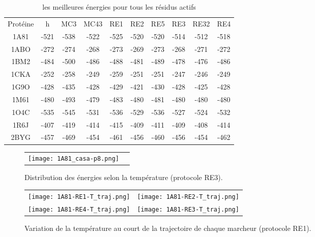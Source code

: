     \begin{table}[h]
      \centering

      \begin{tabular}{cccccccccc}

        \toprule
        Protéine & h & MC3 & MC43 & RE1 & RE2 & RE5 & RE3 & RE32 & RE4 \\
        \cmidrule{1-10}
        1A81 & -521 & -538 & -522 & -525 & -520 & -520 & -514 & -512 & -518 \\
        1ABO & -272 & -274 & -268 & -273 & -269 & -273 & -268 & -271 & -272 \\
        1BM2 & -484 & -500 & -486 & -488 & -481 & -489 & -478 & -476 & -486 \\
        1CKA & -252 & -258 & -249 & -259 & -251 & -251 & -247 & -246 & -249 \\
        1G9O & -428 & -435 & -428 & -429 & -421 & -430 & -428 & -425 & -428 \\
        1M61 & -480 & -493 & -479 & -483 & -480 & -481 & -480 & -480 & -480 \\
        1O4C & -535 & -545 & -531 & -536 & -529 & -536 & -527 & -524 & -532 \\
        1R6J & -407 & -419 & -414 & -415 & -409 & -411 & -409 & -408 & -414 \\
        2BYG & -457 & -469 & -454 & -461 & -456 & -460 & -456 & -454 & -462 \\
  
        \bottomrule

      \end{tabular}      
      \caption{les meilleures énergies pour tous les résidus actifs}
\label{tab:best_ener_all_all}      
    \end{table}


   \begin{figure}[t]
     \centering
     \begin{tabular}{cc}
       \texttt{[image: 1A81\_casa-p8.png]} &
     \end{tabular}
     
     \caption{Distribution des énergies selon la température (protocole RE3).}
\label{graph:Distrib_E_T}
   \end{figure}


   \begin{figure}[t]
     \centering
     \begin{tabular}{cc}
       \texttt{[image: 1A81-RE1-T\_traj.png]} &
       \texttt{[image: 1A81-RE2-T\_traj.png]} \\
       \texttt{[image: 1A81-RE4-T\_traj.png]} &
       \texttt{[image: 1A81-RE3-T\_traj.png]} \\
     \end{tabular}
     \caption{Variation de la température au court de la trajectoire de chaque marcheur (protocole RE1).}
\label{graph:TRAJ_T}
   \end{figure}

